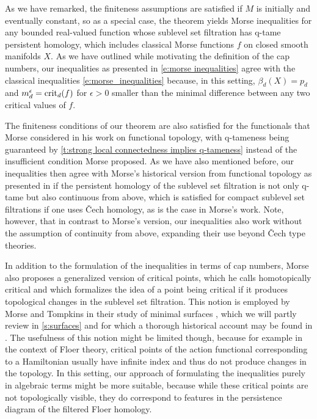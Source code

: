 As we have remarked, the finiteness assumptions are satisfied if $M$ is initially and eventually constant, so as a special case, the theorem yields Morse inequalities for any bounded real-valued function whose sublevel set filtration has q-tame persistent homology, which includes classical Morse functions $f$ on closed smooth manifolds $X$.
As we have outlined while motivating the definition of the cap numbers, our inequalities as presented in \eqref{e:morse inequalities} agree with the classical inequalities \eqref{e:morse_inequalities} because, in this setting, $\beta_d(X) = p_d$ and $m_d^{\epsilon} = \operatorname{crit}_d(f)$ for $\epsilon > 0$ smaller than the minimal difference between any two critical values of $f$.

The finiteness conditions of our theorem are also satisfied for the functionals that Morse considered in his work on functional topology, with q-tameness being guaranteed by \cref{t:strong local connectedness implies q-tameness} instead of the insufficient condition Morse proposed.
As we have also mentioned before, our inequalities then agree with Morse's historical version from functional topology as presented in \cite{Morse.1940} if the persistent homology of the sublevel set filtration is not only q-tame but also continuous from above, which is satisfied for compact sublevel set filtrations if one uses \v{C}ech homology, as is the case in Morse's work.
Note, however, that in contrast to Morse's version, our inequalities also work without the assumption of continuity from above, expanding their use beyond \v{C}ech type theories.

\begin{rem}
	In addition to the formulation of the inequalities in terms of cap numbers, Morse also proposes a generalized version of critical points, which he calls homotopically critical and which formalizes the idea of a point being critical if it produces topological changes in the sublevel set filtration.
	This notion is employed by Morse and Tompkins in their study of minimal surfaces \cite{Morse.1939}, which we will partly review in \cref{s:surfaces} and for which a thorough historical account may be found in \cite[Section II.6]{Struwe.1988}.
	The usefulness of this notion might be limited though, because for example in the context of Floer theory, critical points of the action functional corresponding to a Hamiltonian usually have infinite index and thus do not produce changes in the topology.
	In this setting, our approach of formulating the inequalities purely in algebraic terms might be more suitable, because while these critical points are not topologically visible, they do correspond to features in the persistence diagram of the filtered Floer homology.
\end{rem}
